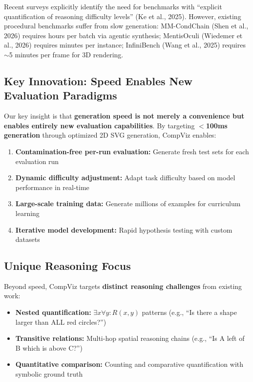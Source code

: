 \documentclass[11pt,a4paper]{article}
\begin{document}
Recent surveys explicitly identify the need for benchmarks with ``explicit quantification of reasoning difficulty levels'' (Ke et al., 2025). However, existing procedural benchmarks suffer from slow generation: MM-CondChain (Shen et al., 2026) requires hours per batch via agentic synthesis; MentisOculi (Wiedemer et al., 2026) requires minutes per instance; InfiniBench (Wang et al., 2025) requires $\sim$5 minutes per frame for 3D rendering.

\subsection{Key Innovation: Speed Enables New Evaluation Paradigms}

Our key insight is that \textbf{generation speed is not merely a convenience but enables entirely new evaluation capabilities}. By targeting \textbf{$<$100ms generation} through optimized 2D SVG generation, CompViz enables:

\begin{enumerate}
    \item \textbf{Contamination-free per-run evaluation:} Generate fresh test sets for each evaluation run
    \item \textbf{Dynamic difficulty adjustment:} Adapt task difficulty based on model performance in real-time
    \item \textbf{Large-scale training data:} Generate millions of examples for curriculum learning
    \item \textbf{Iterative model development:} Rapid hypothesis testing with custom datasets
\end{enumerate}

\subsection{Unique Reasoning Focus}

Beyond speed, CompViz targets \textbf{distinct reasoning challenges} from existing work:

\begin{itemize}
    \item \textbf{Nested quantification:} $\exists x \forall y: R(x,y)$ patterns (e.g., ``Is there a shape larger than ALL red circles?'')
    \item \textbf{Transitive relations:} Multi-hop spatial reasoning chains (e.g., ``Is A left of B which is above C?'')
    \item \textbf{Quantitative comparison:} Counting and comparative quantification with symbolic ground truth
\end{itemize}
\end{document}
